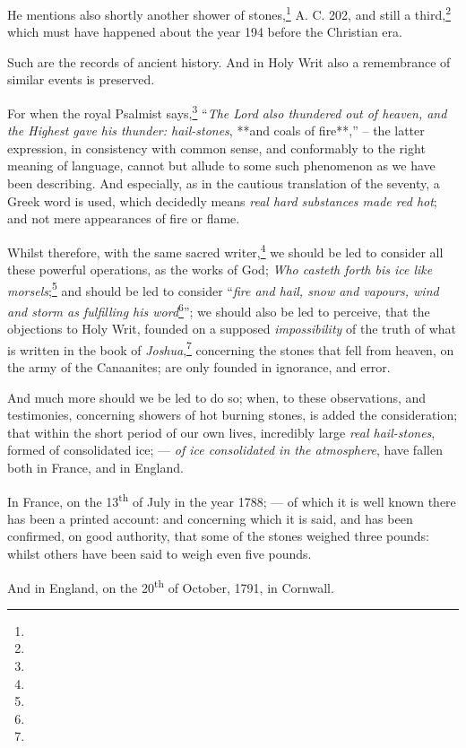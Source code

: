 \documentclass[a4paper, 12pt, oneside, twocolumn]{article}
\begin{document}
He mentions also shortly another shower of stones,\footnote{} A. C. 202, and still a third,\footnote{} which must have happened about the year 194 before the Christian era.

Such are the records of ancient history. And in Holy Writ also a remembrance of similar events is preserved.

For when the royal Psalmist says,\footnote{} ``\emph{The Lord also thundered out of heaven, and the Highest gave his thunder: hail-stones}, **and coals of fire**,'' -- the latter expression, in consistency with common sense, and conformably to the right meaning of language, cannot but allude to some such phenomenon as we have been describing. And especially, as in the cautious translation of the seventy, a Greek word is used, which decidedly means \emph{real hard substances made red hot}; and not mere appearances of fire or flame.

Whilst therefore, with the same sacred writer,\footnote{} we should be led to consider all these powerful operations, as the works of God; \emph{Who casteth forth bis ice like morsels};\footnote{} and should be led to consider ``\emph{fire and hail, snow and vapours, wind and storm as fulfilling his word}\footnote{}''; we should also be led to perceive, that the objections to Holy Writ, founded on a supposed \emph{impossibility} of the truth of what is written in the book of \emph{Joshua},\footnote{} concerning the stones that fell from heaven, on the army of the Canaanites; are only founded in ignorance, and error.

And much more should we be led to do so; when, to these observations, and testimonies, concerning showers of hot burning stones, is added the consideration; that within the short period of our own lives, incredibly large \emph{real hail-stones}, formed of consolidated ice; --- \emph{of ice consolidated in the atmosphere}, have fallen both in France, and in England.

In France, on the 13\textsuperscript{th} of July in the year 1788; --- of which it is well known there has been a printed account: and concerning which it is said, and has been confirmed, on good authority, that some of the stones weighed three pounds: whilst others have been said to weigh even five pounds.

And in England, on the 20\textsuperscript{th} of October, 1791, in Cornwall.
\end{document}
